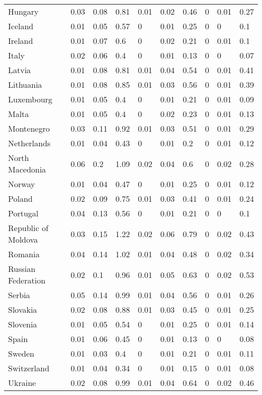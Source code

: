 \begin{longtable}[t]{llllllllll}
Hungary & 0.03 & 0.08 & 0.81 & 0.01 & 0.02 & 0.46 & 0 & 0.01 & 0.27\\
Iceland & 0.01 & 0.05 & 0.57 & 0 & 0.01 & 0.25 & 0 & 0 & 0.1\\
Ireland & 0.01 & 0.07 & 0.6 & 0 & 0.02 & 0.21 & 0 & 0.01 & 0.1\\
Italy & 0.02 & 0.06 & 0.4 & 0 & 0.01 & 0.13 & 0 & 0 & 0.07\\
Latvia & 0.01 & 0.08 & 0.81 & 0.01 & 0.04 & 0.54 & 0 & 0.01 & 0.41\\
Lithuania & 0.01 & 0.08 & 0.85 & 0.01 & 0.03 & 0.56 & 0 & 0.01 & 0.39\\
Luxembourg & 0.01 & 0.05 & 0.4 & 0 & 0.01 & 0.21 & 0 & 0.01 & 0.09\\
Malta & 0.01 & 0.05 & 0.4 & 0 & 0.02 & 0.23 & 0 & 0.01 & 0.13\\
Montenegro & 0.03 & 0.11 & 0.92 & 0.01 & 0.03 & 0.51 & 0 & 0.01 & 0.29\\
Netherlands & 0.01 & 0.04 & 0.43 & 0 & 0.01 & 0.2 & 0 & 0.01 & 0.12\\
North Macedonia & 0.06 & 0.2 & 1.09 & 0.02 & 0.04 & 0.6 & 0 & 0.02 & 0.28\\
Norway & 0.01 & 0.04 & 0.47 & 0 & 0.01 & 0.25 & 0 & 0.01 & 0.12\\
Poland & 0.02 & 0.09 & 0.75 & 0.01 & 0.03 & 0.41 & 0 & 0.01 & 0.24\\
Portugal & 0.04 & 0.13 & 0.56 & 0 & 0.01 & 0.21 & 0 & 0 & 0.1\\
Republic of Moldova & 0.03 & 0.15 & 1.22 & 0.02 & 0.06 & 0.79 & 0 & 0.02 & 0.43\\
Romania & 0.04 & 0.14 & 1.02 & 0.01 & 0.04 & 0.48 & 0 & 0.02 & 0.34\\
Russian Federation & 0.02 & 0.1 & 0.96 & 0.01 & 0.05 & 0.63 & 0 & 0.02 & 0.53\\
Serbia & 0.05 & 0.14 & 0.99 & 0.01 & 0.04 & 0.56 & 0 & 0.01 & 0.26\\
Slovakia & 0.02 & 0.08 & 0.88 & 0.01 & 0.03 & 0.45 & 0 & 0.01 & 0.25\\
Slovenia & 0.01 & 0.05 & 0.54 & 0 & 0.01 & 0.25 & 0 & 0.01 & 0.14\\
Spain & 0.01 & 0.06 & 0.45 & 0 & 0.01 & 0.13 & 0 & 0 & 0.08\\
Sweden & 0.01 & 0.03 & 0.4 & 0 & 0.01 & 0.21 & 0 & 0.01 & 0.11\\
Switzerland & 0.01 & 0.04 & 0.34 & 0 & 0.01 & 0.15 & 0 & 0.01 & 0.08\\
Ukraine & 0.02 & 0.08 & 0.99 & 0.01 & 0.04 & 0.64 & 0 & 0.02 & 0.46\\

\end{longtable}
